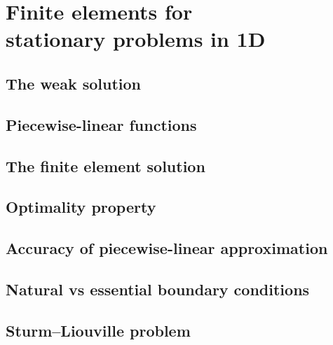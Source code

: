 \chapter[Finite elements in 1D]{Finite elements for \\
stationary problems in 1D}

\section{The weak solution}

\section{Piecewise-linear functions}

\section{The finite element solution}

\section{Optimality property}

\section{Accuracy of piecewise-linear approximation}

\section{Natural vs essential boundary conditions}

\section{Sturm--Liouville problem}
